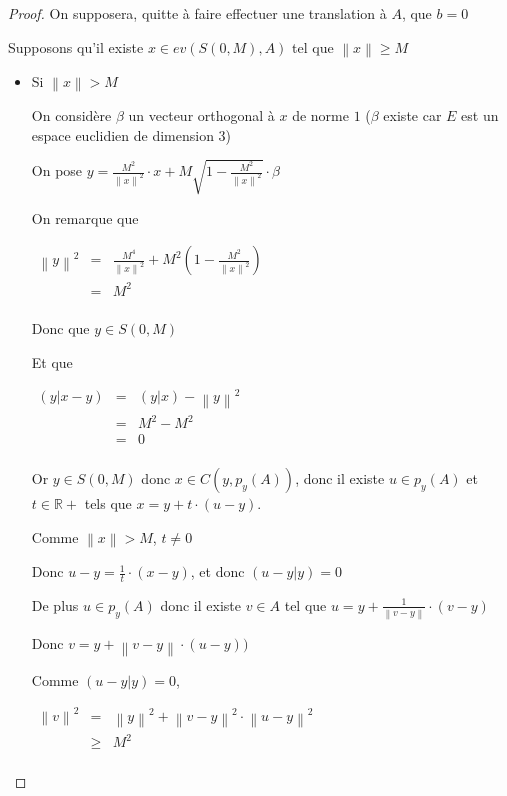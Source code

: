 \documentclass[a4paper]{article}
\newcommand{\norm}[1]{\left\lVert#1\right\rVert}
\begin{document}
\begin{proof}

On supposera, quitte à faire effectuer une translation à $A$, que $b = 0$

Supposons qu'il existe $x \in ev(S(0,M), A)$ tel que $\norm{x} \geqslant M$

\begin{itemize}
\item Si $\norm{x} > M$ 

On considère $\beta$ un vecteur orthogonal à $x$ de norme $1$ ($\beta$ existe car $E$ est un espace euclidien de dimension $3$)

On pose $y = \frac{M^{2}}{\norm{x}^{2}} \cdot x + M \sqrt{1 - \frac{M^{2}}{\norm{x}^{2}}} \cdot \beta$

On remarque que 

$\begin{array}{ccl}
\norm{y}^{2} & = & \frac{M^{4}}{\norm{x}^{2}} + M^{2} (1 -\frac{M^{2}}{\norm{x}^{2}}) \\
             & = &  M^{2}\\
\end{array}$

Donc que $y \in S(0, M)$

Et que

$\begin{array}{ccl}
(y|x - y) & = & (y|x) - \norm{y}^{2}\\
          & = & M^{2} - M^{2}\\
          & = & 0\\
\end{array}$

Or $y \in S(0, M)$ donc $x \in C(y, p_{y}(A))$, donc il existe $u\in p_{y}(A)$ et $t\in \mathbb{R}+$ tels que $x = y + t \cdot (u - y)$.

Comme $\norm{x} > M$, $t\neq 0$

Donc $u - y = \frac{1}{t} \cdot (x - y)$, et donc $(u - y|y) = 0$

De plus $u \in p_{y}(A)$ donc il existe $v \in A$ tel que $u = y + \frac{1}{\norm{v -  y}} \cdot (v - y)$

Donc $v = y + \norm{v - y} \cdot (u - y))$

Comme $(u - y|y) = 0$,

$\begin{array}{ccl}
\norm{v}^{2} & = & \norm{y}^{2} + \norm{v - y}^{2} \cdot \norm{u - y}^{2} \\
     & \geqslant & M^{2} \\
\end{array}$



\end{itemize}
\end{proof}
\end{document}
